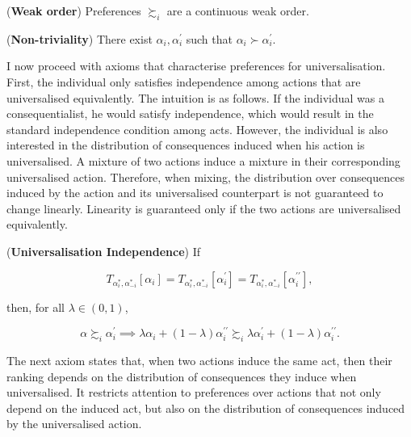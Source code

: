 \begin{axiom}\label{ax:wo}
	 (\textbf{Weak order}) Preferences \(\succsim_i\) are a continuous weak order.
\end{axiom}

\begin{axiom}\label{ax:nond}
	(\textbf{Non-triviality}) There exist \( \alpha_i, \alpha^{\prime}_i \) such that \( \alpha_i \succ \alpha^{\prime}_i \).
\end{axiom}

I now proceed with axioms that characterise preferences for universalisation. First, the individual only satisfies independence among actions that are universalised equivalently. The intuition is as follows. If the individual was a consequentialist, he would satisfy independence, which would result in the standard independence condition among acts. However, the individual is also interested in the distribution of consequences induced when his action is universalised. A mixture of two actions induce a mixture in their corresponding universalised action. Therefore, when mixing, the distribution over consequences induced by the action and its universalised counterpart is not guaranteed to change linearly. Linearity is guaranteed only if the two actions are universalised equivalently.

\begin{axiom}\label{ax:uind}
	(\textbf{Universalisation Independence}) If

	\[
		T_{\alpha^{*}_i, \alpha^{*}_{-i}} [ \alpha_i ] = T_{\alpha^{*}_i, \alpha^{*}_{-i}} [ \alpha^{\prime}_i ] = T_{\alpha^{*}_i, \alpha^{*}_{-i}} [ \alpha_{i}^{\prime \prime} ],
	\]

	then, for all \( \lambda \in (0,1)\),

	\[ \alpha \succsim_i \alpha^{\prime}_i \implies \lambda \alpha_i + (1- \lambda ) \alpha_{i}^{\prime \prime} \succsim_i \lambda \alpha^{\prime}_i + (1- \lambda ) \alpha_{i}^{\prime \prime} .
	\]
\end{axiom}

The next axiom states that, when two actions induce the same act, then their ranking depends on the distribution of consequences they induce when universalised. It restricts attention to preferences over actions that not only depend on the induced act, but also on the distribution of consequences induced by the universalised action.


